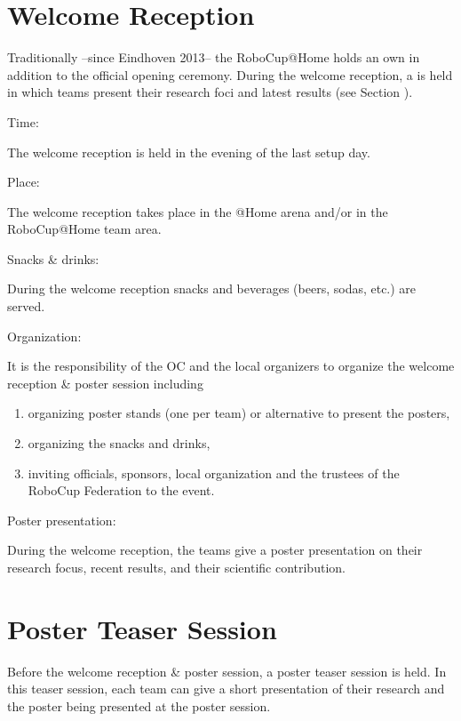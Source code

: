 \section{Welcome Reception}
\label{sec:welcome_recepion}
Traditionally --since Eindhoven 2013-- the RoboCup@Home holds an own  in addition to the official opening ceremony. During the welcome reception, a  is held in which teams present their research foci and latest results (see Section ).
\begin{enumerate}
	{\bf\item Time:} The welcome reception is held in the evening of the last setup day.
	{\bf\item Place:} The welcome reception takes place in the @Home arena and/or in the RoboCup@Home team area.
	{\bf\item Snacks \& drinks:} During the welcome reception snacks and beverages (beers, sodas, etc.) are served.
	{\bf\item Organization:} It is the responsibility of the OC and the local organizers to organize the welcome reception \& poster session including
		\begin{enumerate}
			\item organizing poster stands (one per team) or alternative to present the posters,
			\item organizing the snacks and drinks,
			\item inviting officials, sponsors, local organization and the trustees of the RoboCup Federation to the event.
		\end{enumerate}
	{\bf\item Poster presentation:} During the welcome reception, the teams give a poster presentation on their research focus, recent results, and their scientific contribution.
\end{enumerate}

\section{Poster Teaser Session}
\label{sec:poster_teaser_session}
Before the welcome reception \& poster session, a poster teaser session is held. In this teaser session, each team can give a short presentation of their research and the poster being presented at the poster session.

